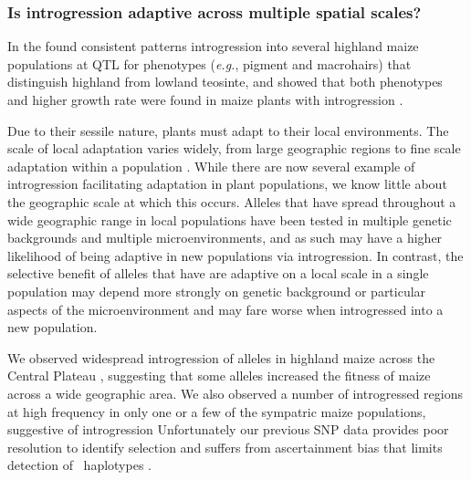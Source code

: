 \subsubsection{Is introgression adaptive across multiple spatial scales?}
\label{sss:scale}




 In the  found consistent patterns introgression into several highland maize populations at QTL for phenotypes (\emph{e.g.}, pigment and macrohairs) that distinguish highland \zm{} from lowland \zp{} teosinte, and showed that both \zm{} phenotypes and higher growth rate were found in maize plants with \zm{}  introgression \citep{Hufford2013}.

Due to their sessile nature, plants must adapt to their local environments. 
The scale of local adaptation varies widely, from large geographic regions \citep{lowry2010, fang2014} to fine scale adaptation within a population \citep{hamrick1979}.  
While there are now several example of introgression facilitating adaptation in plant populations, we know little about the geographic scale at which this occurs.
Alleles that have spread throughout a wide geographic range in local populations have been tested in multiple genetic backgrounds and multiple microenvironments, and as such may have a higher likelihood of being adaptive in new populations via introgression.
In contrast, the selective benefit of alleles that have are adaptive on a local scale in a single population may depend more strongly on genetic background or particular aspects of the microenvironment and may fare worse when introgressed into a new population. 

We observed widespread introgression of \zm{} alleles in highland maize across the Central Plateau \citep{Hufford2013}, suggesting that some \zm{} alleles increased the fitness of maize across a wide geographic area.  
We also observed a number of introgressed regions at high frequency in only one or a few of the sympatric maize populations, suggestive of introgression
Unfortunately our previous SNP data provides poor resolution to identify selection \citep{tiffin2014advances} and suffers from ascertainment bias that limits detection of \zm\ haplotypes \citep{Hufford2013}.  


